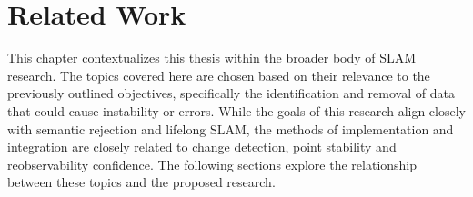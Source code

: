 \section{Related Work}
\label{sec:related_work}

This chapter contextualizes this thesis within the broader body of SLAM research. The topics covered here are chosen based on their relevance to the previously outlined objectives, specifically the identification and removal of data that could cause instability or errors. While the goals of this research align closely with semantic rejection and lifelong SLAM, the methods of implementation and integration are closely related to change detection, point stability and reobservability confidence. The following sections explore the relationship between these topics and the proposed research.

% 